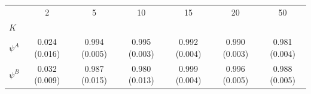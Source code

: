 \begin{tabular}{lcccccc}
\toprule
 & 2 & 5 & 10 & 15 & 20 & 50 \\
$K$ &  &  &  &  &  &  \\
\midrule
$\psi^A$ & 0.024 (0.016) & 0.994 (0.005) & 0.995 (0.003) & 0.992 (0.004) & 0.990 (0.003) & 0.981 (0.004) \\
$\psi^B$ & 0.032 (0.009) & 0.987 (0.015) & 0.980 (0.013) & 0.999 (0.004) & 0.996 (0.005) & 0.988 (0.005) \\
\bottomrule
\end{tabular}

